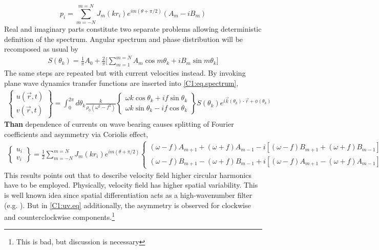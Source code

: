 \begin{equation}
\label{C1:p.eq}
p_i = \sum_{m = -N}^{m = N} J_m(k r_i) e^{im(\theta + \pi/2)} (A_m  - i B_m)
\end{equation}
Real and imaginary parts constitute two separate problems allowing deterministic definition of the spectrum. Angular spectrum and phase distribution will be recomposed as usual by
\begin{align}
\label{C1:eq.sp.rec}
S(\theta_k) = \frac{1}{\pi} A_0 + \frac{2}{\pi} \big[ \sum_{m = 1}^{m = N} A_m \cos m\theta_k + i 
B_m \sin m\theta_k \big]
\end{align}
The same steps are repeated but with current velocities instead. By invoking plane wave dynamics 
transfer functions are inserted into \eqref{C1:eq.spectrum},
\begin{align}
\begin{Bmatrix}
u(\vec{r}, t) \\ v(\vec{r}, t)
\end{Bmatrix}
=\int_0^{2\pi} d \theta_k \frac{k}{\rho_0 (\omega^2 - f^2)} 
\begin{Bmatrix}
\omega k \cos \theta_k + i f \sin \theta_k \\ \omega k \sin \theta_k - i f \cos \theta_k
\end{Bmatrix}
S(\theta_k) e^{i \vec{k}(\theta_k) \cdot \vec{r} + \phi(\theta_k)}
\end{align}
\textbf{Than} dependence of currents on wave bearing causes splitting of Fourier coefficients and 
asymmetry via Coriolis effect,
\begin{align}
\label{C1:uv.eq}
\begin{Bmatrix}
u_i \\ v_i
\end{Bmatrix}
= \frac{1}{2} \sum_{m = -N}^{m = N} J_{m} (kr_i) e^{im(\theta + \pi/2)}
\begin{Bmatrix}
(\omega - f) A_{m + 1} + (\omega + f) A_{m - 1} - i [(\omega - f) B_{m + 1} + (\omega + f) B_{m - 1}] \\ 
(\omega - f) B_{m + 1} - (\omega + f) B_{m - 1} + i [ (\omega - f) A_{m + 1} - (\omega + f) A_{m - 1}]
\end{Bmatrix}
\end{align}
This results points out that to describe velocity field higher circular harmonics have to be employed. Physically, velocity field has higher spatial variability. This is well known idea since spatial differentiation acts as a high-wavenumber filter (e.g. \cite{rhines1977dynamics}). But in \eqref{C1:uv.eq} additionally, the asymmetry is observed for clockwise and counterclockwise components.\footnote{This is bad, but discussion is necessary}

